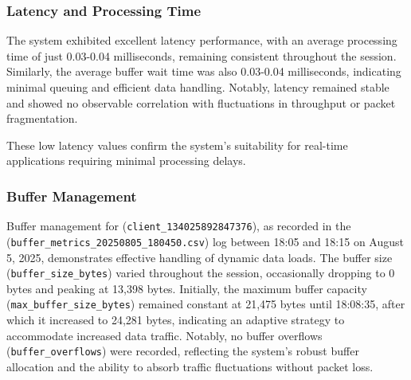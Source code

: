 \subsubsection{Latency and Processing Time}
The system exhibited excellent latency performance, with an average processing time of just 0.03-0.04 milliseconds, remaining consistent throughout the session. Similarly, the average buffer wait time was also 0.03-0.04 milliseconds, indicating minimal queuing and efficient data handling. Notably, latency remained stable and showed no observable correlation with fluctuations in throughput or packet fragmentation.

These low latency values confirm the system's suitability for real-time applications requiring minimal processing delays.

\subsubsection{Buffer Management}
Buffer management for (\texttt{client\_134025892847376}), as recorded in the (\texttt{buffer\_metrics\allowbreak{}\_20250805\_180450.csv}) log between 18:05 and 18:15 on August 5, 2025, demonstrates effective handling of dynamic data loads. The buffer size (\texttt{buffer\_size\_bytes}) varied throughout the session, occasionally dropping to 0 bytes and peaking at 13{,}398 bytes. Initially, the maximum buffer capacity (\texttt{max\_buffer\_size\_bytes}) remained constant at 21{,}475 bytes until 18:08:35, after which it increased to 24{,}281 bytes, indicating an adaptive strategy to accommodate increased data traffic. Notably, no buffer overflows (\texttt{buffer\_overflows}) were recorded, reflecting the system’s robust buffer allocation and the ability to absorb traffic fluctuations without packet loss.

